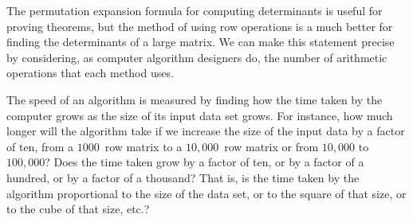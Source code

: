 The permutation expansion formula for computing determinants is useful 
for proving theorems, but the method of using row operations
is a much better for finding the determinants of a large matrix.
We can make this statement 
precise by considering, as computer algorithm designers do,
the number of arithmetic operations that each method uses.

The speed of an algorithm is measured by finding 
how the time taken by the computer grows as the size of
its input data set grows. 
For instance, how much longer will the algorithm take if
we increase the size of the input data by a
factor of ten, from a $1000$~row matrix to a $10,000$~row matrix 
or from $10,000$ to $100,000$?
Does the time taken grow by a factor of ten,
or by a factor of a hundred, or by a factor of a thousand?
That is, 
is the time taken by the algorithm proportional to the size of the data set, 
or to the square of that size, or to the cube of that size, etc.? 

